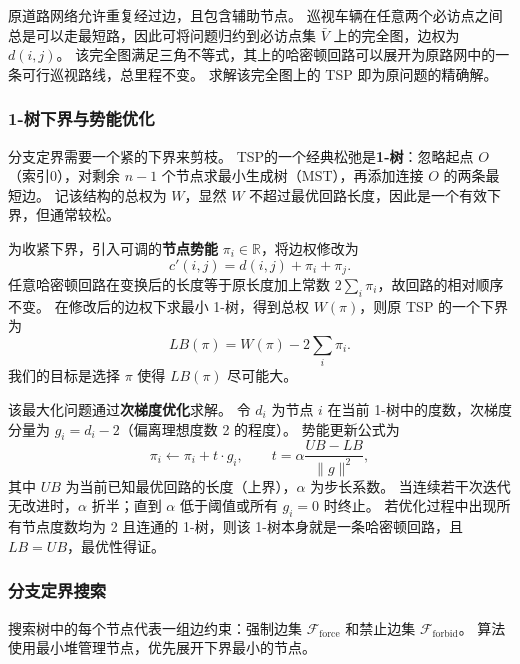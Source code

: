 \documentclass[a4paper, 12pt]{article}
\begin{document}
原道路网络允许重复经过边，且包含辅助节点。
巡视车辆在任意两个必访点之间总是可以走最短路，因此可将问题归约到必访点集 $\bar V$ 上的完全图，边权为 $d(i,j)$。
该完全图满足三角不等式，其上的哈密顿回路可以展开为原路网中的一条可行巡视路线，总里程不变。
求解该完全图上的 TSP 即为原问题的精确解。

\subsubsection{1-树下界与势能优化}

分支定界需要一个紧的下界来剪枝。
TSP的一个经典松弛是{\bfseries 1-树}：忽略起点 $O$（索引0），对剩余 $n-1$ 个节点求最小生成树（MST），再添加连接 $O$ 的两条最短边。
记该结构的总权为 $W$，显然 $W$ 不超过最优回路长度，因此是一个有效下界，但通常较松。

为收紧下界，引入可调的{\bfseries 节点势能} $\pi_i\in\mathbb{R}$，将边权修改为
\begin{equation}
    c'(i,j) = d(i,j) + \pi_i + \pi_j. \label{eq:modified-weight}
\end{equation}
任意哈密顿回路在变换后的长度等于原长度加上常数 $2\sum_i\pi_i$，故回路的相对顺序不变。
在修改后的边权下求最小 1-树，得到总权 $W(\pi)$，则原 TSP 的一个下界为
\begin{equation}
    LB(\pi) = W(\pi) - 2\sum_i \pi_i. \label{eq:one-tree-lb}
\end{equation}
我们的目标是选择 $\pi$ 使得 $LB(\pi)$ 尽可能大。

该最大化问题通过{\bfseries 次梯度优化}求解。
令 $d_i$ 为节点 $i$ 在当前 1-树中的度数，次梯度分量为 $g_i = d_i - 2$（偏离理想度数 2 的程度）。
势能更新公式为
\begin{equation}
    \pi_i \leftarrow \pi_i + t\cdot g_i,\qquad
    t = \alpha\frac{UB - LB}{\|g\|^2}, \label{eq:subgradient-update}
\end{equation}
其中 $UB$ 为当前已知最优回路的长度（上界），$\alpha$ 为步长系数。
当连续若干次迭代无改进时，$\alpha$ 折半；直到 $\alpha$ 低于阈值或所有 $g_i=0$ 时终止。
若优化过程中出现所有节点度数均为 2 且连通的 1-树，则该 1-树本身就是一条哈密顿回路，且 $LB=UB$，最优性得证。

\subsubsection{分支定界搜索}

搜索树中的每个节点代表一组边约束：强制边集 $\mathcal{F}_{\text{force}}$ 和禁止边集 $\mathcal{F}_{\text{forbid}}$。
算法使用最小堆管理节点，优先展开下界最小的节点。
\end{document}
